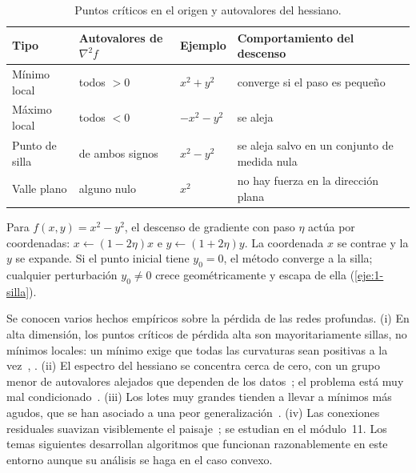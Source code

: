 \begin{table}[h]
\centering\small
\caption{Puntos críticos en el origen y autovalores del hessiano.}\label{tab:criticos}
\begin{tabular}{@{}llll@{}}
\toprule
Tipo & Autovalores de $\nabla^{2}f$ & Ejemplo & Comportamiento del descenso \\
\midrule
Mínimo local & todos $>0$ & $x^{2}+y^{2}$ & converge si el paso es pequeño \\
Máximo local & todos $<0$ & $-x^{2}-y^{2}$ & se aleja \\
Punto de silla & de ambos signos & $x^{2}-y^{2}$ & se aleja salvo en un conjunto de medida nula \\
Valle plano & alguno nulo & $x^{2}$ & no hay fuerza en la dirección plana \\
\bottomrule
\end{tabular}
\end{table}

\begin{ejemplo}[Silla]\label{ej:silla}
Para $f(x,y)=x^{2}-y^{2}$, el descenso de gradiente con paso $\eta$ actúa por coordenadas: $x\leftarrow(1-2\eta)x$ e $y\leftarrow(1+2\eta)y$. La coordenada $x$ se contrae y la $y$ se expande. Si el punto inicial tiene $y_0=0$, el método converge a la silla; cualquier perturbación $y_0\ne 0$ crece geométricamente y escapa de ella (\cref{eje:1-silla}).
\end{ejemplo}

\begin{observacion}\label{obs:paisaje}
Se conocen varios hechos empíricos sobre la pérdida de las redes profundas. (i) En alta dimensión, los puntos críticos de pérdida alta son mayoritariamente sillas, no mínimos locales: un mínimo exige que todas las curvaturas sean positivas a la vez~\cite{dauphin}, \cite[§8.2.3]{gbc}. (ii) El espectro del hessiano se concentra cerca de cero, con un grupo menor de autovalores alejados que dependen de los datos~\cite{sagun}; el problema está muy mal condicionado~\cite[§8.2.1]{gbc}. (iii) Los lotes muy grandes tienden a llevar a mínimos más agudos, que se han asociado a una peor generalización~\cite{keskar}. (iv) Las conexiones residuales suavizan visiblemente el paisaje~\cite{li-paisaje}; se estudian en el módulo~11. Los temas siguientes desarrollan algoritmos que funcionan razonablemente en este entorno aunque su análisis se haga en el caso convexo.
\end{observacion}

